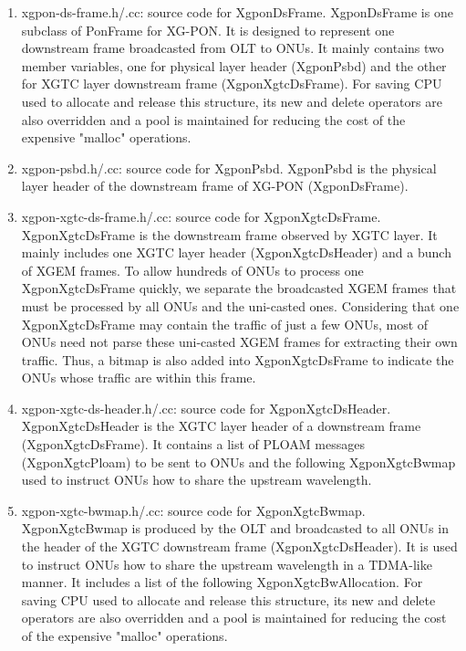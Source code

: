 \begin{enumerate}
 \item xgpon-ds-frame.h/.cc: source code for {\color{red} XgponDsFrame}. XgponDsFrame is one subclass of PonFrame for XG-PON.
 It is designed to represent one downstream frame broadcasted from OLT to ONUs. It mainly contains two member variables,
 one for physical layer header (XgponPsbd) and the other for XGTC layer downstream frame (XgponXgtcDsFrame).
 For saving CPU used to allocate and release this structure, its new and delete operators are also overridden
 and a pool is maintained for reducing the cost of the expensive
 "malloc" operations.

 \item xgpon-psbd.h/.cc: source code for {\color{red} XgponPsbd}. XgponPsbd is the physical layer header of the downstream frame of XG-PON (XgponDsFrame).

 \item xgpon-xgtc-ds-frame.h/.cc: source code for {\color{red} XgponXgtcDsFrame}. 
XgponXgtcDsFrame is the downstream frame observed by XGTC layer. It mainly includes one XGTC layer header 
(XgponXgtcDsHeader) and a bunch of XGEM frames. To allow hundreds of ONUs to process one XgponXgtcDsFrame 
quickly, we separate the broadcasted XGEM frames that must be processed by all ONUs and the uni-casted ones. 
Considering that one XgponXgtcDsFrame may contain the traffic of just a few ONUs, most of ONUs need not 
parse these uni-casted XGEM frames for extracting their own traffic. Thus, a bitmap is also added into XgponXgtcDsFrame 
to indicate the ONUs whose traffic are within this frame.

 \item xgpon-xgtc-ds-header.h/.cc: source code for {\color{red} XgponXgtcDsHeader}. 
XgponXgtcDsHeader is the XGTC layer header of a downstream frame (XgponXgtcDsFrame). 
It contains a list of PLOAM messages (XgponXgtcPloam) to be sent to ONUs and the 
following XgponXgtcBwmap used to instruct ONUs how to share the upstream wavelength.

 \item xgpon-xgtc-bwmap.h/.cc: source code for {\color{red} XgponXgtcBwmap}. XgponXgtcBwmap is produced by the OLT and broadcasted to all ONUs in the header of the XGTC downstream frame (XgponXgtcDsHeader). It is used to instruct ONUs how to share the upstream wavelength in a TDMA-like manner.
 It includes a list of the following XgponXgtcBwAllocation. For saving CPU used to allocate and release this structure, its new and delete operators are also overridden and a pool is maintained for reducing the cost of the expensive "malloc"
 operations.


\end{enumerate}
